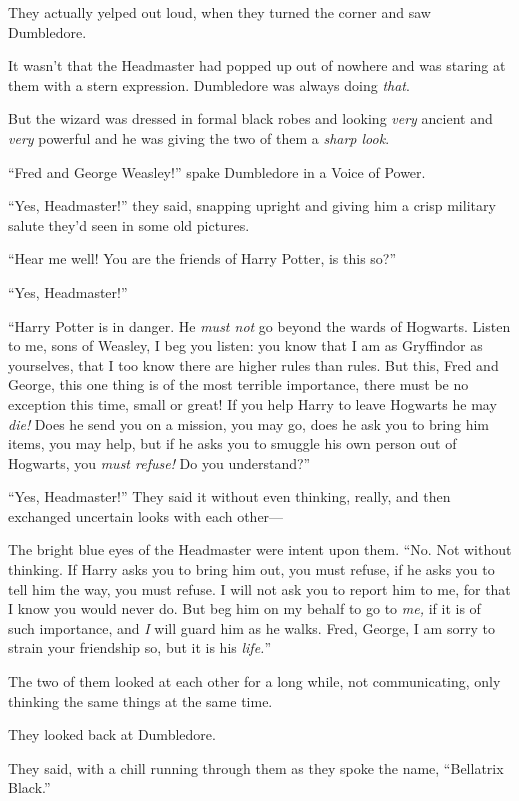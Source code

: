 
They actually yelped out loud, when they turned the corner and saw Dumbledore.

It wasn’t that the Headmaster had popped up out of nowhere and was staring at them with a stern expression. Dumbledore was always doing \emph{that}.

But the wizard was dressed in formal black robes and looking \emph{very} ancient and \emph{very} powerful and he was giving the two of them a \emph{sharp look}.

“Fred and George Weasley!” spake Dumbledore in a Voice of Power.

“Yes, Headmaster!” they said, snapping upright and giving him a crisp military salute they’d seen in some old pictures.

“Hear me well! You are the friends of Harry Potter, is this so?”

“Yes, Headmaster!”

“Harry Potter is in danger. He \emph{must not} go beyond the wards of Hogwarts. Listen to me, sons of Weasley, I beg you listen: you know that I am as Gryffindor as yourselves, that I too know there are higher rules than rules. But this, Fred and George, this one thing is of the most terrible importance, there must be no exception this time, small or great! If you help Harry to leave Hogwarts he may \emph{die!} Does he send you on a mission, you may go, does he ask you to bring him items, you may help, but if he asks you to smuggle his own person out of Hogwarts, you \emph{must refuse!} Do you understand?”

“Yes, Headmaster!” They said it without even thinking, really, and then exchanged uncertain looks with each other—

The bright blue eyes of the Headmaster were intent upon them. “No. Not without thinking. If Harry asks you to bring him out, you must refuse, if he asks you to tell him the way, you must refuse. I will not ask you to report him to me, for that I know you would never do. But beg him on my behalf to go to \emph{me,} if it is of such importance, and \emph{I} will guard him as he walks. Fred, George, I am sorry to strain your friendship so, but it is his \emph{life.}”

The two of them looked at each other for a long while, not communicating, only thinking the same things at the same time.

They looked back at Dumbledore.

They said, with a chill running through them as they spoke the name, “Bellatrix Black.”

